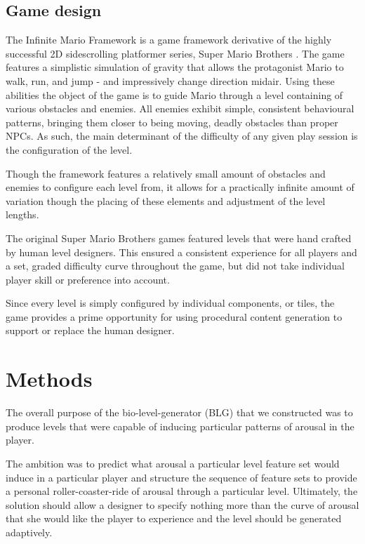\documentclass{llncs}
\begin{document}
\subsection{Game design}
The Infinite Mario Framework is a game framework derivative of the highly successful 2D sidescrolling platformer series, Super Mario Brothers \cite{marioai}.
The game features a simplistic simulation of gravity that allows the protagonist Mario to walk, run, and jump - and impressively change direction midair.
Using these abilities the object of the game is to guide Mario through a level containing of various obstacles and enemies. All enemies exhibit simple, consistent behavioural patterns, bringing them closer to being moving, deadly obstacles than proper NPCs. As such, the main determinant of the difficulty of any given play session is the configuration of the level.

Though the framework features a relatively small amount of obstacles and enemies to configure each level from, it allows for a practically infinite amount of variation though the placing of these elements and adjustment of the level lengths.

The original Super Mario Brothers games featured levels that were hand crafted by human level designers. This ensured a consistent experience for all players and a set, graded difficulty curve throughout the game, but did not take individual player skill or preference into account.

Since every level is simply configured by individual components, or tiles, the game provides a prime opportunity for using procedural content generation to support or replace the human designer.

\section{Methods}
The overall purpose of the bio-level-generator (BLG) that we constructed was to produce levels that were capable of inducing particular patterns of arousal in the player.

The ambition was to predict what arousal a particular level feature set would induce in a particular player and structure the sequence of feature sets to provide a personal roller-coaster-ride of arousal through a particular level.
Ultimately, the solution should allow a designer to specify nothing more than the curve of arousal that she would like the player to experience and the level should be generated adaptively.
\end{document}
